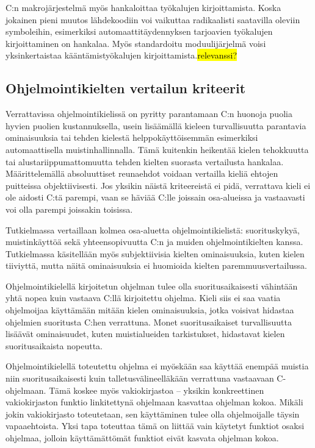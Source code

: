 C:n makrojärjestelmä myös hankaloittaa työkalujen kirjoittamista. Koska
jokainen pieni muutos lähdekoodiin voi vaikuttaa radikaalisti saatavilla
oleviin symboleihin, esimerkiksi automaattitäydennyksen tarjoavien työkalujen
kirjoittaminen on hankalaa. Myös standardoitu moduulijärjelmä voisi
yksinkertaistaa kääntämistyökalujen kirjoittamista.\hl{relevanssi?}

\subsection{Ohjelmointikielten vertailun kriteerit}
\label{sec:abs}


Verrattavissa ohjelmointikielissä on pyritty parantamaan C:n huonoja puolia
hyvien puolien kustannuksella, usein lisäämällä kieleen turvallisuutta
parantavia ominaisuuksia tai tehden kielestä helppokäyttöisemmän esimerkiksi
automaattisella muistinhallinnalla. Tämä kuitenkin heikentää kielen tehokkuutta
tai alustariippumattomuutta tehden kielten suorasta vertailusta hankalaa.
Määrittelemällä absoluuttiset reunaehdot voidaan vertailla kieliä ehtojen
puitteissa objektiivisesti. Jos yksikin näistä kriteereistä ei pidä, verrattava
kieli ei ole aidosti C:tä parempi, vaan se häviää C:lle joissain osa-alueissa
ja vastaavasti voi olla parempi joissakin toisissa.

Tutkielmassa vertaillaan kolmea osa-aluetta ohjelmointikielistä: suorituskykyä,
muistinkäyttöä sekä yhteensopivuutta C:n ja muiden ohjelmointikielten kanssa.
Tutkielmassa käsitellään myös subjektiivisia kielten ominaisuuksia, kuten
kielen tiiviyttä, mutta näitä
ominaisuuksia ei huomioida kielten paremmuusvertailussa.

Ohjelmointikielellä kirjoitetun ohjelman tulee olla suoritusaikaisesti
vähintään yhtä nopea kuin vastaava C:llä kirjoitettu ohjelma. Kieli siis ei saa
vaatia ohjelmoijaa käyttämään mitään kielen ominaisuuksia, jotka voisivat
hidastaa ohjelmien suoritusta C:hen verrattuna. Monet suoritusaikaiset
turvallisuutta lisäävät ominaisuudet, kuten muistialueiden tarkistukset,
hidastavat kielen suoritusaikaista nopeutta.

Ohjelmointikielellä toteutettu ohjelma ei myöskään saa käyttää enempää muistia
niin suoritusaikaisesti kuin talletusvälineelläkään verrattuna vastaavaan
C-ohjelmaan. Tämä koskee myös vakiokirjastoa --
yksikin konkreettinen vakiokirjaston funktio linkitettynä ohjelmaan kasvattaa
ohjelman kokoa. Mikäli jokin vakiokirjasto toteutetaan, sen käyttäminen tulee
olla ohjelmoijalle täysin vapaaehtoista. Yksi tapa toteuttaa tämä on liittää
vain käytetyt funktiot osaksi ohjelmaa, jolloin käyttämättömät funktiot eivät
kasvata ohjelman kokoa.

